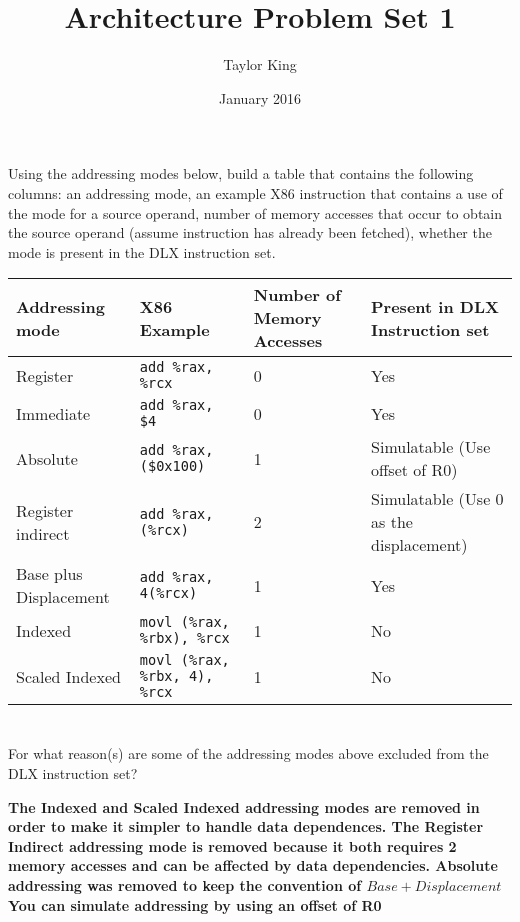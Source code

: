 \documentclass{article}
\title{Architecture Problem Set 1}
\author{Taylor King }
\date{January 2016}
\begin{document}
\maketitle

\section{}
Using the addressing modes below, build a table that contains the following columns: an addressing mode, an example X86 instruction that contains a use of the mode for a source operand, number of memory accesses that occur to obtain the source operand (assume instruction has already been fetched), whether the mode is present in the DLX instruction set.
\vspace{5mm}


\begin{tabular}{|p{3cm}|p{3cm}|p{3cm}|p{4cm}|}
    \hline
    Addressing mode & X86 Example & Number of Memory Accesses & Present in DLX Instruction set \\
    \hline
    Register & \texttt{add \%rax, \%rcx} & 0 & Yes \\
    Immediate & \texttt{add \%rax, \$4} & 0 & Yes \\
    Absolute & \texttt{add \%rax, (\$0x100)} & 1 & Simulatable (Use offset of R0) \\
    Register indirect & \texttt{add \%rax, (\%rcx)} & 2 & Simulatable (Use 0 as the displacement) \\ 
    Base plus Displacement & \texttt{add \%rax, 4(\%rcx)} & 1 & Yes\\ 
    Indexed & \texttt{movl (\%rax, \%rbx), \%rcx} & 1 & No \\ 
    Scaled Indexed & \texttt{movl (\%rax, \%rbx, 4), \%rcx} & 1 & No \\
    \hline
\end{tabular}
\vspace{5mm}
\section{} 
For what reason(s) are some of the addressing modes above excluded from the DLX instruction set?\\
\vspace{5mm}

\textbf{The Indexed and Scaled Indexed addressing modes are removed in order to make it simpler to handle data dependences. The Register Indirect addressing mode is removed because it both requires 2 memory accesses and can be affected by data dependencies. Absolute addressing was removed to keep the convention of $Base + Displacement$ You can simulate addressing by using an offset of R0}
\pagebreak
\end{document}
